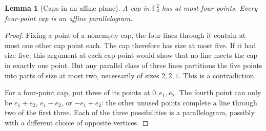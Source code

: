 \documentclass[11pt]{article}
\newtheorem{lemma}[theorem]{Lemma}
\theoremstyle{remark}
\newcommand{\F}{\mathbb F_3}
\begin{document}
\begin{lemma}[Caps in an affine plane]\label{lem:planecap}
A cap in $\F^2$ has at most four points. Every four-point cap is an affine
parallelogram.
\end{lemma}
\begin{proof}
Fixing a point of a nonempty cap, the four lines through it contain at most
one other cap point each. The cap therefore has size at most five.
If it had size five, this argument at each cap point would show that no line
meets the cap in exactly one point. But any parallel class of three lines
partitions the five points into parts of size at most two, necessarily of
sizes $2,2,1$. This is a contradiction.

For a four-point cap, put three of its points at $0,e_1,e_2$. The fourth
point can only be $e_1+e_2$, $e_1-e_2$, or $-e_1+e_2$: the other unused
points complete a line through two of the first three. Each of the three
possibilities is a parallelogram, possibly with a different choice of
opposite vertices.
\end{proof}
\end{document}
